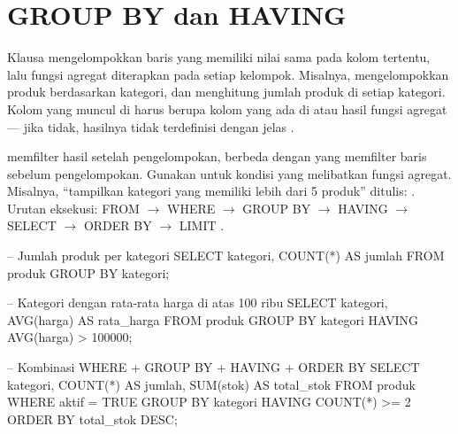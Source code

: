 \section{GROUP BY dan HAVING}

Klausa  mengelompokkan baris yang memiliki nilai sama pada kolom tertentu, lalu fungsi agregat diterapkan pada setiap kelompok. Misalnya,  mengelompokkan produk berdasarkan kategori, dan  menghitung jumlah produk di setiap kategori. Kolom yang muncul di  harus berupa kolom yang ada di  atau hasil fungsi agregat --- jika tidak, hasilnya tidak terdefinisi dengan jelas \cite{mysqlDocs}.

 memfilter hasil setelah pengelompokan, berbeda dengan  yang memfilter baris sebelum pengelompokan. Gunakan  untuk kondisi yang melibatkan fungsi agregat. Misalnya, ``tampilkan kategori yang memiliki lebih dari 5 produk'' ditulis: . Urutan eksekusi: FROM $\to$ WHERE $\to$ GROUP BY $\to$ HAVING $\to$ SELECT $\to$ ORDER BY $\to$ LIMIT \cite{mysqlGettingStarted}.

\begin{webcode}[language=SQL, caption={GROUP BY dan HAVING}]
-- Jumlah produk per kategori
SELECT kategori, COUNT(*) AS jumlah
FROM produk
GROUP BY kategori;

-- Kategori dengan rata-rata harga di atas 100 ribu
SELECT kategori, AVG(harga) AS rata_harga
FROM produk
GROUP BY kategori
HAVING AVG(harga) > 100000;

-- Kombinasi WHERE + GROUP BY + HAVING + ORDER BY
SELECT kategori, COUNT(*) AS jumlah, SUM(stok) AS total_stok
FROM produk
WHERE aktif = TRUE
GROUP BY kategori
HAVING COUNT(*) >= 2
ORDER BY total_stok DESC;
\end{webcode}

